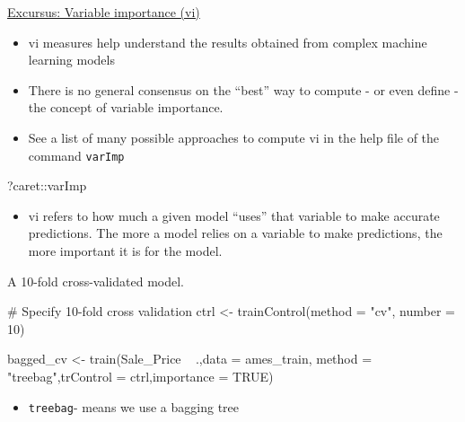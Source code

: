 \documentclass[
  10pt,
  ignorenonframetext,
]{beamer}
\newenvironment{Shaded}{}{}
\newcommand{\CommentTok}[1]{\textcolor[rgb]{0.00,0.50,0.00}{#1}}
\newcommand{\DataTypeTok}[1]{#1}
\newcommand{\DecValTok}[1]{#1}
\newcommand{\KeywordTok}[1]{\textcolor[rgb]{0.00,0.00,1.00}{#1}}
\newcommand{\NormalTok}[1]{#1}
\newcommand{\OperatorTok}[1]{#1}
\newcommand{\OtherTok}[1]{\textcolor[rgb]{1.00,0.25,0.00}{#1}}
\newcommand{\StringTok}[1]{\textcolor[rgb]{0.00,0.50,0.50}{#1}}
\providecommand{\tightlist}{%
  \setlength{\itemsep}{0pt}\setlength{\parskip}{0pt}}
\begin{document}
\begin{frame}[fragile]{\href{https://cran.r-project.org/web/packages/datarobot/vignettes/VariableImportance.html}{Excursus:
Variable importance (vi)}}
\protect\hypertarget{excursus-variable-importance-vi}{}

\begin{itemize}
\tightlist
\item
  vi measures help understand the results obtained from complex machine
  learning models
\item
  There is no general consensus on the ``best'' way to compute - or even
  define - the concept of variable importance.
\item
  See a list of many possible approaches to compute vi in the help file
  of the command \texttt{varImp}
\end{itemize}

\begin{Shaded}
\begin{Highlighting}[]
\NormalTok{?caret}\OperatorTok{::}\NormalTok{varImp}
\end{Highlighting}
\end{Shaded}

\begin{itemize}
\tightlist
\item
  vi refers to how much a given model ``uses'' that variable to make
  accurate predictions. The more a model relies on a variable to make
  predictions, the more important it is for the model.
\end{itemize}

\end{frame}

\begin{frame}[fragile]{A 10-fold cross-validated model.}
\protect\hypertarget{a-10-fold-cross-validated-model.}{}

\begin{Shaded}
\begin{Highlighting}[]
\CommentTok{# Specify 10-fold cross validation}
\NormalTok{ctrl <-}\StringTok{ }\KeywordTok{trainControl}\NormalTok{(}\DataTypeTok{method =} \StringTok{"cv"}\NormalTok{,  }\DataTypeTok{number =} \DecValTok{10}\NormalTok{) }

\NormalTok{bagged_cv <-}\StringTok{ }\KeywordTok{train}\NormalTok{(Sale_Price }\OperatorTok{~}\StringTok{ }\NormalTok{.,}\DataTypeTok{data =}\NormalTok{ ames_train,}
  \DataTypeTok{method =} \StringTok{"treebag"}\NormalTok{,}\DataTypeTok{trControl =}\NormalTok{ ctrl,}\DataTypeTok{importance =} \OtherTok{TRUE}\NormalTok{)}
\end{Highlighting}
\end{Shaded}

\begin{itemize}
\tightlist
\item
  \texttt{treebag}- means we use a bagging tree
\end{itemize}

\end{frame}
\end{document}

